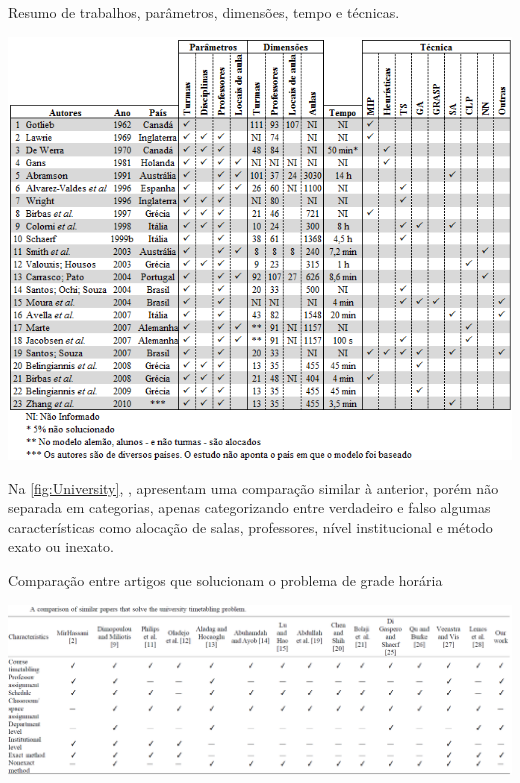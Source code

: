 
\begin{CenteredFigure} \caption{Resumo de trabalhos, parâmetros, dimensões, tempo e técnicas.} \label{fig:Desenvolvimento}
  \includegraphics[width=\textwidth]{files/img/2.02!2-marco/Desenvolvimento}
\end{CenteredFigure}    %

Na \autoref{fig:University}, , apresentam uma comparação similar à anterior, porém não separada em categorias, apenas categorizando entre verdadeiro e falso algumas características como alocação de salas, professores, nível institucional e método exato ou inexato.

\begin{CenteredFigure} \caption{Comparação entre artigos que solucionam o problema de grade horária} \label{fig:University}
  \includegraphics[width=\textwidth]{files/img/2.02!2-marco/University}
\end{CenteredFigure}    %

